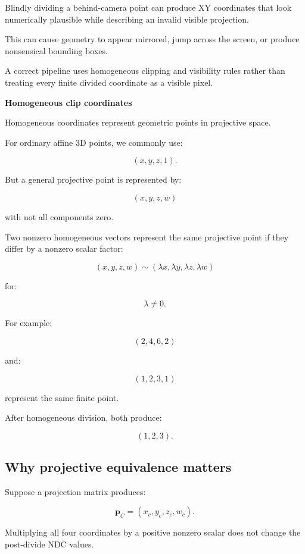 Blindly dividing a behind-camera point can produce XY coordinates that look numerically plausible while describing an invalid visible projection.

This can cause geometry to appear mirrored, jump across the screen, or produce nonsensical bounding boxes.

A correct pipeline uses homogeneous clipping and visibility rules rather than treating every finite divided coordinate as a visible pixel.

\textbf{Homogeneous clip coordinates}

Homogeneous coordinates represent geometric points in projective space.

For ordinary affine 3D points, we commonly use:

\[
 (x,y,z,1).
\]

But a general projective point is represented by:

\[
 \boxed{ (x,y,z,w) }
\]

with not all components zero.

Two nonzero homogeneous vectors represent the same projective point if they differ by a nonzero scalar factor:

\[
 \boxed{ (x,y,z,w) \sim (\lambda x,\lambda y,\lambda z,\lambda w) }
\]

for:

\[
 \lambda\ne0.
\]

For example:

\[
 (2,4,6,2)
\]

and:

\[
 (1,2,3,1)
\]

represent the same finite point.

After homogeneous division, both produce:

\[
 (1,2,3).
\]

\subsection{Why projective equivalence matters}\label{02-foundations-ii-ch033-why-projective-equivalence-matters}

\hypertarget{02-foundations-ii-ch033-why-projective-equivalence-matters}{}

Suppose a projection matrix produces:

\[
 \mathbf p_C=(x_c,y_c,z_c,w_c).
\]

Multiplying all four coordinates by a positive nonzero scalar does not change the post-divide NDC values.

